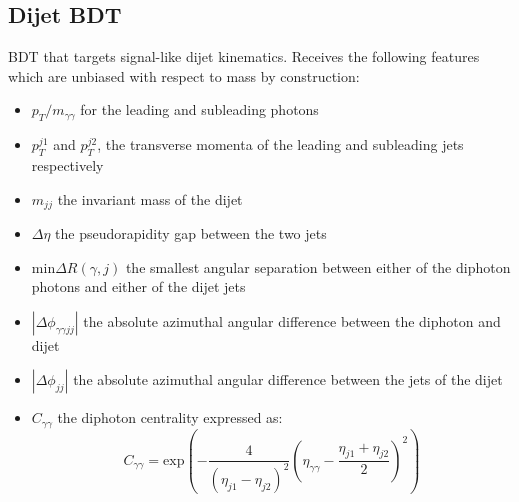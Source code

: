 \subsection{Dijet BDT}
BDT that targets signal-like dijet kinematics. Receives the following features which are unbiased with respect to mass by construction:
\begin{itemize}[leftmargin=.5in,noitemsep]
    \item $p_{T}/m_{\gamma\gamma}$ for the leading and subleading photons
    \item $p_{T}^{j1}$ and $p_{T}^{j2}$, the transverse momenta of the leading and subleading jets respectively
    \item $m_{jj}$ the invariant mass of the dijet
    \item $\Delta\eta$ the pseudorapidity gap between the two jets
    \item $\mathrm{min}\Delta{R}(\gamma,j)$ the smallest angular separation between either of the diphoton photons and either of the dijet jets
    \item $|\Delta\phi_{\gamma\gamma{jj}}|$ the absolute azimuthal angular difference between the diphoton and dijet
    \item $|\Delta\phi_{jj}|$ the absolute azimuthal angular difference between the jets of the dijet
    \item $C_{\gamma\gamma}$ the diphoton centrality expressed as:
        \begin{equation}
            C_{\gamma\gamma} = \mathrm{exp}\left(-\frac{4}{(\eta_{j1} - \eta_{j2})^{2}}\left( \eta_{\gamma\gamma} - \frac{\eta_{j1} + \eta_{j2}}{2} \right)^{2}\right)
        \end{equation}
\end{itemize}




